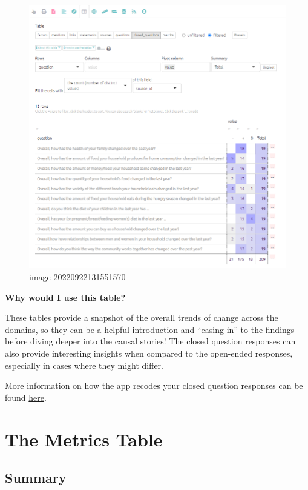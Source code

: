 \documentclass[
]{book}
\begin{document}
\begin{figure}
\centering
\includegraphics[width=6.77083in,height=\textheight]{_assets/image-20220922131551570.png}
\caption{image-20220922131551570}
\end{figure}

\textbf{Why would I use this table?}

These tables provide a snapshot of the overall trends of change across the domains, so they can be a helpful introduction and ``easing in'' to the findings - before diving deeper into the causal stories! The closed question responses can also provide interesting insights when compared to the open-ended responses, especially in cases where they might differ.

More information on how the app recodes your closed question responses can be found \href{https://guide.causalmap.app/importing-your-data-special-cases.html?q=recodes\#quip-recodes-for-closed-questions---live-link}{here}.

\hypertarget{xmetrics-old}{%
\chapter{The Metrics Table}\label{xmetrics-old}}

\hypertarget{summary-1}{%
\section{Summary}\label{summary-1}}
\end{document}
